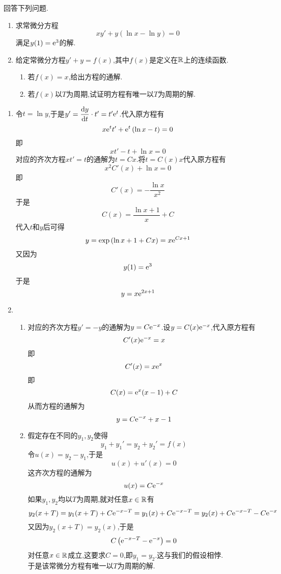 \documentclass{ctexart}
\begin{document}
\begin{problem}[4.(20\songti{分})]
    回答下列问题.
    \begin{enumerate}[label=\tbf{(\arabic*)}]
        \item 求常微分方程
            \[xy'+y\left(\ln x-\ln y\right)=0\]
            满足$y(1)=\mathrm{e}^3$的解.
        \item 给定常微分方程$y'+y=f(x)$,其中$f(x)$是定义在$\mathbb{R}$上的连续函数.
            \begin{enumerate}[label=\tbf{(\alph*)}]
                \item 若$f(x)=x$,给出方程的通解.
                \item 若$f(x)$以$T$为周期,试证明方程有唯一以$T$为周期的解.
            \end{enumerate}
    \end{enumerate}    
\end{problem}
\begin{solution}
    \begin{enumerate}[label=\tbf{(\arabic*)}]
        \item 令$t=\ln y$,于是$y'=\dfrac{\mathrm{d} y}{\mathrm{d} t}\cdot t'=t'\mathrm{e}^t$.代入原方程有
            \[x\mathrm{e}^t t'+\mathrm{e}^t\left(\ln x-t\right)=0\]
            即
            \[xt'-t+\ln x=0\]
            对应的齐次方程$xt'=t$的通解为$t=Cx$.将$t=C(x)x$代入原方程有
            \[x^2C'(x)+\ln x=0\]
            即
            \[C'(x)=-\dfrac{\ln x}{x^2}\]
            于是
            \[C(x)=\dfrac{\ln x+1}{x}+C\]
            代入$t$和$y$后可得
            \[y=\exp\left(\ln x+1+Cx\right)=x\mathrm{e}^{Cx+1}\]
            又因为
            \[y(1)=\mathrm{e}^3\]
            于是
            \[y=x\mathrm{e}^{2x+1}\]
        \item 
            \begin{enumerate}[label=\tbf{(\alph*)}]
                \item 对应的齐次方程$y'=-y$的通解为$y=C\mathrm{e}^{-x}$.设$y=C(x)\mathrm{e}^{-x}$,代入原方程有
                    \[C'(x)\mathrm{e}^{-x}=x\]
                    即
                    \[C'(x)=x\mathrm{e}^x\]
                    即
                    \[C(x)=\mathrm{e}^x(x-1)+C\]
                    从而方程的通解为
                    \[y=C\mathrm{e}^{-x}+x-1\]
                \item 
                    假定存在不同的$y_1,y_2$使得
                    \[y_1+y_1'=y_2+y_2'=f(x)\]
                    令$u(x)=y_2-y_1$,于是
                    \[u(x)+u'(x)=0\]
                    这齐次方程的通解为
                    \[u(x)=C\mathrm{e}^{-x}\]
                    如果$y_1,y_2$均以$T$为周期,就对任意$x\in\mathbb{R}$有
                    \[y_2(x+T)=y_1(x+T)+C\mathrm{e}^{-x-T}=y_1(x)+C\mathrm{e}^{-x-T}=y_2(x)+C\mathrm{e}^{-x-T}-C\mathrm{e}^{-x}\]
                    又因为$y_2(x+T)=y_2(x)$,于是
                    \[C\left(\mathrm{e}^{-x-T}-\mathrm{e}^{-x}\right)=0\]
                    对任意$x\in\mathbb{R}$成立,这要求$C=0$,即$y_1=y_2$.这与我们的假设相悖.\\
                    于是该常微分方程有唯一以$T$为周期的解.
            \end{enumerate}
    \end{enumerate}  
\end{solution}
\end{document}
